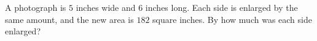 A photograph is $5$ inches wide and $6$ inches long. Each side is enlarged by the same amount, and the new area is $182$ square inches. By how much was each side enlarged?
